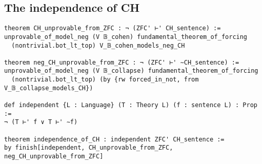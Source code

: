 \documentclass[sigplan,10pt,review, autoref,anonymous]{acmart}
\theoremstyle{definition}
\begin{document}






\subsection{The independence of CH} \label{subsection:forcing:independence}

\begin{lstlisting}
theorem CH_unprovable_from_ZFC : ¬ (ZFC' ⊢' CH_sentence) :=
unprovable_of_model_neg (V 𝔹_cohen) fundamental_theorem_of_forcing
  (nontrivial.bot_lt_top) V_𝔹_cohen_models_neg_CH

theorem neg_CH_unprovable_from_ZFC : ¬ (ZFC' ⊢' ∼CH_sentence) :=
unprovable_of_model_neg (V 𝔹_collapse) fundamental_theorem_of_forcing
  (nontrivial.bot_lt_top) (by {rw forced_in_not, from V_𝔹_collapse_models_CH})

def independent {L : Language} (T : Theory L) (f : sentence L) : Prop :=
¬ (T ⊢' f ∨ T ⊢' ∼f)

theorem independence_of_CH : independent ZFC' CH_sentence :=
by finish[independent, CH_unprovable_from_ZFC, neg_CH_unprovable_from_ZFC]
\end{lstlisting}
\end{document}
